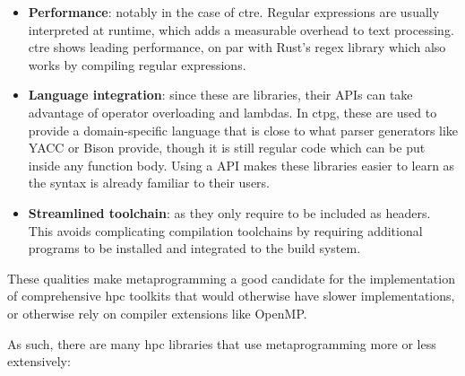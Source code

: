 \documentclass[../main]{subfiles}
\begin{document}
\begin{itemize}

  \item

\textbf{Performance}: notably in the case of \gls{ctre}.
Regular expressions are usually interpreted at runtime,
which adds a measurable overhead to text processing.
\gls{ctre} shows leading performance, on par with Rust's regex library
which also works by compiling regular expressions.

  \item

\textbf{Language integration}: since these are \cpp libraries,
their APIs can take advantage of \cpp operator overloading and lambdas.
In \gls{ctpg}, these are used to provide a domain-specific language that is
close to what parser generators like YACC or Bison provide,
though it is still regular \cpp code which can be put inside any function body.
Using a \cpp API makes these libraries easier to learn
as the syntax is already familiar to their users.

  \item

\textbf{Streamlined toolchain}: as they only require to be included as headers.
This avoids complicating compilation toolchains by requiring additional programs
to be installed and integrated to the build system.

\end{itemize}

These qualities make metaprogramming a good candidate for the implementation
of comprehensive \gls{hpc} toolkits that would otherwise have
slower implementations, or otherwise rely on compiler extensions like OpenMP.

As such, there are many \cpp \gls{hpc} libraries that use metaprogramming
more or less extensively:
\end{document}
